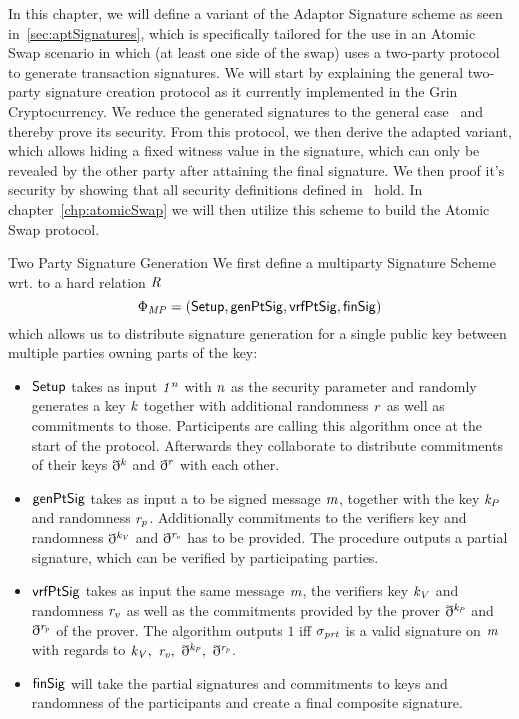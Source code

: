 In this chapter, we will define a variant of the Adaptor Signature scheme as seen in~\ref{sec:aptSignatures},
which is specifically tailored for the use in an Atomic Swap scenario in which (at least one side of the swap) uses a two-party protocol to generate transaction signatures.
We will start by explaining the general two-party signature creation protocol as it currently implemented in the Grin Cryptocurrency.
We reduce the generated signatures to the general case~\cite{schnorr1991efficient} and thereby prove its security. From this protocol, we then derive the adapted variant, which allows hiding a fixed witness
value in the signature, which can only be revealed by the other party after attaining the final signature.
We then proof it's security by showing that all security definitions defined in~\cite{sanches2020bitcoinchannels} hold.
In chapter~\ref{chp:atomicSwap} we will then utilize this scheme to build the Atomic Swap protocol.

\begin{definition}{Two Party Signature Generation}\label{def:twoPartySig}
    We first define a multiparty Signature Scheme wrt. to a hard relation $\mathit{R}$
    \[ \Phi_{\mathit{MP}} = (\mathsf{Setup}, \mathsf{genPtSig}, \mathsf{vrfPtSig}, \mathsf{finSig}) \]
    which allows us to distribute signature generation for a single public key between multiple parties owning parts of the key:
    \begin{itemize}
        \item $\mathsf{Setup}$ takes as input $\mathit{1^n}$ with $\mathit{n}$ as the security parameter and randomly generates a key $\mathit{k}$ together with additional randomness $\mathit{r}$ as well
        as commitments to those. Participents are calling this algorithm once at the start of the protocol. Afterwards they collaborate to distribute commitments of their keys $\mathbb{g}^{\mathit{k}}$ and $\mathbb{g}^{\mathit{r}}$
        with each other.
        \item $\mathsf{genPtSig}$ takes as input a to be signed message $\mathit{m}$, together with the key $\mathit{k}_{\mathit{P}}$ and randomness $\mathit{r}_{\mathit{p}}$. Additionally commitments to the verifiers
        key and randomness $\mathbb{g}^{\mathit{k}_{\mathit{V}}}$ and $\mathbb{g}^{\mathit{r}_{\mathit{v}}}$ has to be provided. The procedure outputs a partial signature, which can be verified by participating parties.
        \item $\mathsf{vrfPtSig}$ takes as input the same message $\mathit{m}$, the verifiers key $\mathit{k}_{\mathit{V}}$ and randomness $\mathit{r}_{\mathit{v}}$ as well as the commitments provided by the prover
        $\mathbb{g}^{\mathit{k}_{\mathit{P}}}$ and $\mathbb{g}^{\mathit{r}_{\mathit{p}}}$ of the prover. The algorithm outputs $1$ iff $\sigma_{\mathit{prt}}$ is a valid signature on $\mathit{m}$ with regards to
        $\mathit{k}_{\mathit{V}} ,~ \mathit{r}_{\mathit{v}} ,~ \mathbb{g}^{\mathit{k}_{\mathit{P}}} ,~ \mathbb{g}^{\mathit{r}_{\mathit{p}}}$.
        \item $\mathsf{finSig}$ will take the partial signatures and commitments to keys and randomness of the participants and create a final composite signature.
    \end{itemize}
\end{definition}

